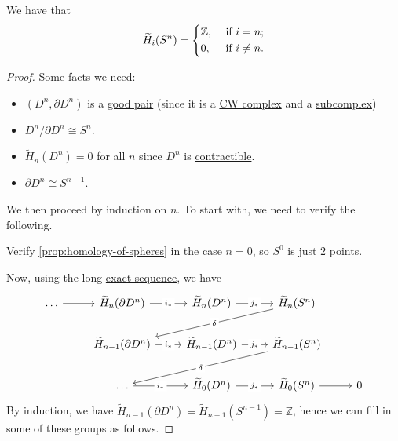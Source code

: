 \begin{proposition}\label{prop:homology-of-spheres}
	We have that
	\[
		\widetilde{H}_i(S^n) = \begin{dcases}
			\mathbb{Z} , & \text{ if } i = n ;    \\
			0,           & \text{ if } i \neq n .
		\end{dcases}
	\]
\end{proposition}
\begin{proof}
	Some facts we need:
	\begin{itemize}
		\item \((D^n, \partial D^n)\) is a \hyperref[def:good-pair]{good pair} (since it is a \hyperref[def:CW-Complex]{CW complex}
		      and a \hyperref[def:CW-subcomplex]{subcomplex})
		\item \(D^n /\partial D^n \cong S^n\).
		\item \(\widetilde{H}_n(D^n) = 0\) for all \(n\) since \(D^n\) is \hyperref[def:contractible]{contractible}.
		\item \(\partial D^n \cong S^{n - 1}\).
	\end{itemize}
	We then proceed by induction on \(n\). To start with, we need to verify the following.
	\begin{exercise}
		Verify \autoref{prop:homology-of-spheres} in the case \(n = 0\), so \(S^0 \) is just \(2\) points.
	\end{exercise}
	Now, using the long \hyperref[def:exact-sequence]{exact sequence}, we have
	\[
		\begin{tikzcd}
			\dots & {\widetilde{H}_n(\partial D^n)} & {\widetilde{H}_n(D^n)} & {\widetilde{H}_n(S^n)} \\
			& {\widetilde{H}_{n-1}(\partial D^n)} & {\widetilde{H}_{n-1}(D^n)} & {\widetilde{H}_{n-1}(S^n)} \\
			& \dots & {\widetilde{H}_{0}(D^n)} & {\widetilde{H}_{0}(S^n)} & 0
			\arrow["{j_\ast}"{description}, from=1-3, to=1-4]
			\arrow["{j_\ast}"{description}, from=2-3, to=2-4]
			\arrow[from=3-4, to=3-5]
			\arrow["{i_\ast}"{description}, from=2-2, to=2-3]
			\arrow["{i_\ast}"{description}, from=1-2, to=1-3]
			\arrow[from=1-1, to=1-2]
			\arrow["\delta"{description}, from=1-4, to=2-2]
			\arrow["\delta"{description}, from=2-4, to=3-2]
			\arrow["{j_\ast}"{description}, from=3-3, to=3-4]
			\arrow["{i_\ast}"{description}, from=3-2, to=3-3]
		\end{tikzcd}
	\]
	By induction, we have \(\widetilde{H} _{n-1}(\partial D^n) = \widetilde{H} _{n-1}(S^{n-1}) = \mathbb{Z} \), hence we can fill in some of these groups as follows.

\end{proof}
